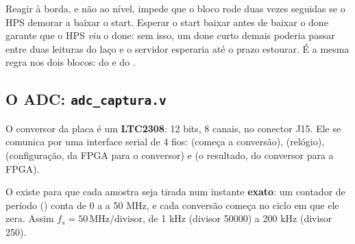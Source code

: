 \documentclass[11pt,a4paper,oneside]{article}
\begin{document}
\begin{porque}
Reagir à borda, e não ao nível, impede que o bloco rode duas vezes seguidas se
o HPS demorar a baixar o start. Esperar o start baixar antes de baixar o done
garante que o HPS \emph{viu} o done: sem isso, um done curto demais poderia
passar entre duas leituras do laço e o servidor esperaria até o prazo
estourar. É a mesma regra nos dois blocos:  do
 e  do .
\end{porque}

\subsection{O ADC: \texttt{adc\_captura.v}}

O conversor da placa é um \textbf{LTC2308}: 12 bits, 8 canais, no conector
J15. Ele se comunica por uma interface serial de 4 fios:  (começa
a conversão),  (relógio),  (configuração, da FPGA para o
conversor) e  (o resultado, do conversor para a FPGA).

O  existe para que cada amostra seja tirada num instante
\textbf{exato}: um contador de período () conta de 0 a
 a 50 MHz, e cada conversão começa no ciclo em que ele zera.
Assim \(f_s = 50\,\text{MHz} / \text{divisor}\), de 1 kHz
(divisor 50000) a 200 kHz (divisor 250).

\begin{center}
\end{center}
\end{document}
